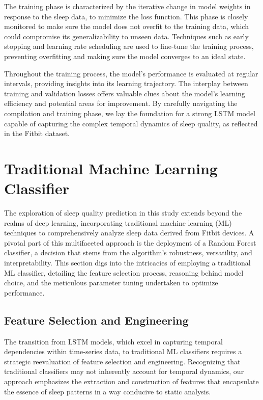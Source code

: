 \documentclass[10pt]{extarticle}
\begin{document}
The training phase is characterized by the iterative change in model weights in response to the sleep data, to minimize the loss function. This phase is closely monitored to make sure the model does not overfit to the training data, which could compromise its generalizability to unseen data. Techniques such as early stopping and learning rate scheduling are used to fine-tune the training process, preventing overfitting and making sure the model converges to an ideal state.

Throughout the training process, the model's performance is evaluated at regular intervals, providing insights into its learning trajectory. The interplay between training and validation losses offers valuable clues about the model's learning efficiency and potential areas for improvement. By carefully navigating the compilation and training phase, we lay the foundation for a strong LSTM model capable of capturing the complex temporal dynamics of sleep quality, as reflected in the Fitbit dataset.

\section{Traditional Machine Learning Classifier}

The exploration of sleep quality prediction in this study extends beyond the realms of deep learning, incorporating traditional machine learning (ML) techniques to comprehensively analyze sleep data derived from Fitbit devices. A pivotal part of this multifaceted approach is the deployment of a Random Forest classifier, a decision that stems from the algorithm's robustness, versatility, and interpretability. This section digs into the intricacies of employing a traditional ML classifier, detailing the feature selection process, reasoning behind model choice, and the meticulous parameter tuning undertaken to optimize performance.

\subsection{Feature Selection and Engineering}

The transition from LSTM models, which excel in capturing temporal dependencies within time-series data, to traditional ML classifiers requires a strategic reevaluation of feature selection and engineering. Recognizing that traditional classifiers may not inherently account for temporal dynamics, our approach emphasizes the extraction and construction of features that encapsulate the essence of sleep patterns in a way conducive to static analysis.
\end{document}
